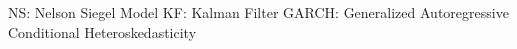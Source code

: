 NS: Nelson Siegel Model
KF: Kalman Filter
GARCH: Generalized Autoregressive Conditional Heteroskedasticity
